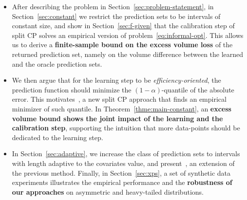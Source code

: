 \begin{itemize}[leftmargin=*]
    \item After describing the problem in Section~\ref{sec:problem-statement}, in Section~\ref{sec:constant} we restrict the prediction sets to be intervals of constant size, and show in Section~\ref{sec:f-given} that the calibration step of split CP solves an empirical version of problem~\eqref{eq:informal-opt}. This allows us to derive a \textbf{finite-sample bound on the excess volume loss} of the returned prediction set, namely on the volume difference between the learned and the oracle prediction sets.
    \item We then argue that for the learning step to be \emph{efficiency-oriented}, the prediction function should minimize the $(1-\alpha)$-quantile of the absolute error. This motivates~\method, a new split CP approach that finds an empirical minimizer of such quantile. In Theorem~\ref{thme:main-constant}, an \textbf{excess volume bound shows the joint impact of the learning and the calibration step}, supporting the intuition that more data-points should be dedicated to the learning step.
    \item In Section~\ref{sec:adaptive}, we increase the class of prediction sets to intervals with length adaptive to the covariates value, and present~\methodAD, an extension of the previous method. Finally, in Section~\ref{sec:xps}, a set of synthetic data experiments illustrates the empirical performance and the \textbf{robustness of our approaches} on asymmetric and heavy-tailed distributions.
\end{itemize}



